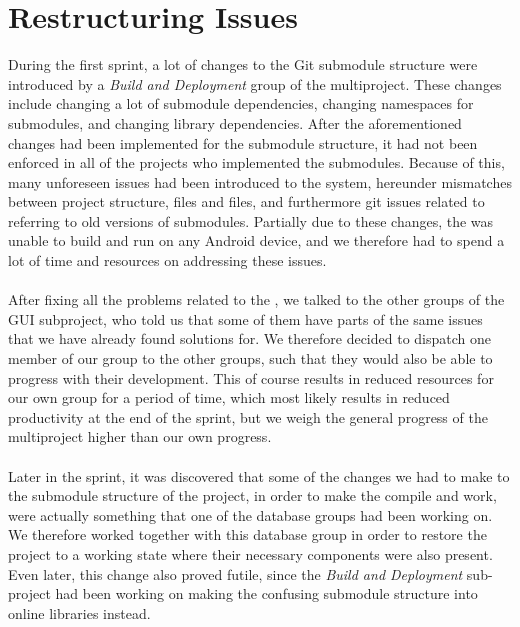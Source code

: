 \section{Restructuring Issues}
\label{sec:restructuring_issues}

During the first sprint, a lot of changes to the Git submodule structure were introduced by a \emph{Build and Deployment} group of the multiproject. These changes include changing a lot of submodule dependencies, changing namespaces for submodules, and changing library dependencies. After the aforementioned changes had been implemented for the submodule structure, it had not been enforced in all of the \giraf projects who implemented the submodules. Because of this, many unforeseen issues had been introduced to the system, hereunder mismatches between project structure,  files and  files, and furthermore git issues related to referring to old versions of submodules. Partially due to these changes, the \ct was unable to build and run on any Android device, and we therefore had to spend a lot of time and resources on addressing these issues. 
\\\\
After fixing all the problems related to the \ct, we talked to the other groups of the GUI subproject, who told us that some of them have parts of the same issues that we have already found solutions for. We therefore decided to dispatch one member of our group to the other groups, such that they would also be able to progress with their development. This of course results in reduced resources for our own group for a period of time, which most likely results in reduced productivity at the end of the sprint, but we weigh the general progress of the multiproject higher than our own progress.
\\\\
Later in the sprint, it was discovered that some of the changes we had to make to the submodule structure of the project, in order to make the \ct compile and work, were actually something that one of the database groups had been working on. We therefore worked together with this database group in order to restore the project to a working state where their necessary components were also present. Even later, this change also proved futile, since the \emph{Build and Deployment} sub-project had been working on making the confusing submodule structure into online libraries instead. 

